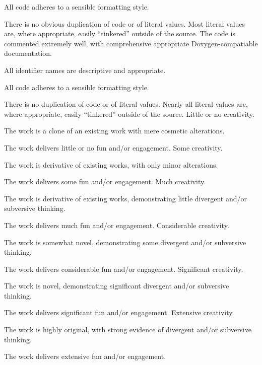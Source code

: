 \documentclass{../../fal_assignment}
\begin{document}
\begin{markingrubric}
            \par All code adheres to a sensible formatting style.
             \par There is no obvious duplication of code or of literal values. Most literal values are, where appropriate, easily ``tinkered'' outside of the source.  
        \grade The code is commented extremely well, with comprehensive appropriate Doxygen-compatiable documentation.
            \par All identifier names are descriptive and appropriate.
            \par All code adheres to a sensible formatting style.
            \par There is no duplication of code or of literal values. Nearly all literal values are, where appropriate, easily ``tinkered'' outside of the source.  
%
        \grade\fail Little or no creativity.
            \par The work is a clone of an existing work with mere cosmetic alterations.
            \par The work delivers little or no fun and/or engagement.
        \grade Some creativity.
            \par The work is derivative of existing works, with only minor alterations.
            \par The work delivers some fun and/or engagement.
        \grade Much creativity.
            \par The work is derivative of existing works, demonstrating little divergent and/or subversive thinking.
            \par The work delivers much fun and/or engagement.
        \grade Considerable creativity.
            \par The work is somewhat novel, demonstrating some divergent and/or subversive thinking.
            \par The work delivers considerable fun and/or engagement.
        \grade Significant creativity.
            \par The work is novel, demonstrating significant divergent and/or subversive thinking.
            \par The work delivers significant fun and/or engagement.
        \grade Extensive creativity.
            \par The work is highly original, with strong evidence of divergent and/or subversive thinking.
            \par The work delivers extensive fun and/or engagement.

\end{markingrubric}
\end{document}
